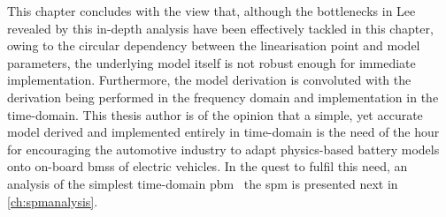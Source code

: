 

This  chapter  concludes  with  the  view  that,  although  the  bottlenecks  in
Lee~\etal~\cite{Lee2012a}  revealed   by  this   in-depth  analysis   have  been
effectively tackled  in this chapter,  owing to the circular  dependency between
the linearisation point and model parameters, the underlying model itself is not
robust enough for immediate implementation. Furthermore, the model derivation is
convoluted  with the  derivation being  performed  in the  frequency domain  and
implementation in the  time-domain. This thesis author is of  the opinion that a
simple, yet  accurate model derived  and implemented entirely in  time-domain is
the  need  of  the  hour  for  encouraging  the  automotive  industry  to  adapt
physics-based battery models onto on-board  \glspl{bms} of electric vehicles. In
the quest to fulfil this need, an analysis of the simplest time-domain \gls{pbm}
\viz~the \gls{spm} is presented next in \cref{ch:spmanalysis}.

